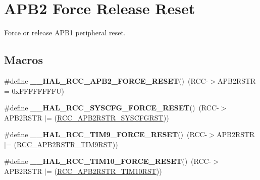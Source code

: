 \hypertarget{group___r_c_c___a_p_b2___force___release___reset}{\section{A\-P\-B2 Force Release Reset}
\label{group___r_c_c___a_p_b2___force___release___reset}
}


Force or release A\-P\-B1 peripheral reset.  


\subsection*{Macros}
\begin{DoxyCompactItemize}
\item 
\hypertarget{group___r_c_c___a_p_b2___force___release___reset_ga8788da8c644ad0cc54912baede7d49b4}{\#define {\bfseries \-\_\-\-\_\-\-H\-A\-L\-\_\-\-R\-C\-C\-\_\-\-A\-P\-B2\-\_\-\-F\-O\-R\-C\-E\-\_\-\-R\-E\-S\-E\-T}()~(R\-C\-C-\/$>$A\-P\-B2\-R\-S\-T\-R = 0x\-F\-F\-F\-F\-F\-F\-F\-F\-U)}\label{group___r_c_c___a_p_b2___force___release___reset_ga8788da8c644ad0cc54912baede7d49b4}

\item 
\hypertarget{group___r_c_c___a_p_b2___force___release___reset_ga143ff27d8f59a39732efd79539e3765a}{\#define {\bfseries \-\_\-\-\_\-\-H\-A\-L\-\_\-\-R\-C\-C\-\_\-\-S\-Y\-S\-C\-F\-G\-\_\-\-F\-O\-R\-C\-E\-\_\-\-R\-E\-S\-E\-T}()~(R\-C\-C-\/$>$A\-P\-B2\-R\-S\-T\-R $\vert$= (\hyperlink{group___peripheral___registers___bits___definition_ga813d42b8d48ae6379c053a44870af49d}{R\-C\-C\-\_\-\-A\-P\-B2\-R\-S\-T\-R\-\_\-\-S\-Y\-S\-C\-F\-G\-R\-S\-T}))}\label{group___r_c_c___a_p_b2___force___release___reset_ga143ff27d8f59a39732efd79539e3765a}

\item 
\hypertarget{group___r_c_c___a_p_b2___force___release___reset_ga9a62b264dec3df075dc7207993a9650e}{\#define {\bfseries \-\_\-\-\_\-\-H\-A\-L\-\_\-\-R\-C\-C\-\_\-\-T\-I\-M9\-\_\-\-F\-O\-R\-C\-E\-\_\-\-R\-E\-S\-E\-T}()~(R\-C\-C-\/$>$A\-P\-B2\-R\-S\-T\-R $\vert$= (\hyperlink{group___peripheral___registers___bits___definition_gab3aa588d4814a289d939e111492724af}{R\-C\-C\-\_\-\-A\-P\-B2\-R\-S\-T\-R\-\_\-\-T\-I\-M9\-R\-S\-T}))}\label{group___r_c_c___a_p_b2___force___release___reset_ga9a62b264dec3df075dc7207993a9650e}

\item 
\hypertarget{group___r_c_c___a_p_b2___force___release___reset_gaa40d4e3fd1261bb0cd239575a433e8e8}{\#define {\bfseries \-\_\-\-\_\-\-H\-A\-L\-\_\-\-R\-C\-C\-\_\-\-T\-I\-M10\-\_\-\-F\-O\-R\-C\-E\-\_\-\-R\-E\-S\-E\-T}()~(R\-C\-C-\/$>$A\-P\-B2\-R\-S\-T\-R $\vert$= (\hyperlink{group___peripheral___registers___bits___definition_gac76155acdc99c8c6502ba3beba818f42}{R\-C\-C\-\_\-\-A\-P\-B2\-R\-S\-T\-R\-\_\-\-T\-I\-M10\-R\-S\-T}))}\label{group___r_c_c___a_p_b2___force___release___reset_gaa40d4e3fd1261bb0cd239575a433e8e8}


\end{DoxyCompactItemize}
